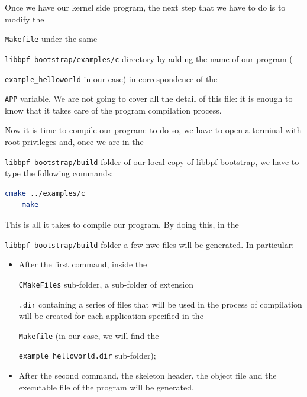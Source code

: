 Once we have our kernel side program, the next step that we have to do is to modify the \raggedright\colorbox{backcolour}{\lstinline[style=commandline, language=bash]|Makefile|} under the same \raggedright\colorbox{backcolour}{\lstinline[style=commandline, language=bash]|libbpf-bootstrap/examples/c|} directory by adding the name of our program (\raggedright\colorbox{backcolour}{\lstinline[style=commandline, language=bash]|example_helloworld|} in our case) in correspondence of the \raggedright\colorbox{backcolour}{\lstinline[style=commandline, language=bash]|APP|} variable.
We are not going to cover all the detail of this file: it is enough to know that it takes care of the program compilation process.

Now it is time to compile our program: to do so, we have to open a terminal with root privileges and, once we are in the \raggedright\colorbox{backcolour}{\lstinline[style=commandline, language=bash]|libbpf-bootstrap/build|} folder of our local copy of libbpf-bootstrap, we have to type the following commands:

\begin{lstlisting}[style=commandline, language=bash, caption={Programs compilation commands in libbpf-bootstrap.}]
	cmake ../examples/c
	make
\end{lstlisting}

This is all it takes to compile our program.
By doing this, in the \raggedright\colorbox{backcolour}{\lstinline[style=commandline, language=bash]|libbpf-bootstrap/build|} folder a few nwe files will be generated.
In particular:

\begin{itemize}
	\item 
		After the first command, inside the \raggedright\colorbox{backcolour}{\lstinline[style=commandline, language=bash]|CMakeFiles|} sub-folder, a sub-folder of extension \raggedright\colorbox{backcolour}{\lstinline[style=commandline, language=bash]|.dir|} containing a series of files that will be used in the process of compilation will be created for each application specified in the \raggedright\colorbox{backcolour}{\lstinline[style=commandline, language=bash]|Makefile|} (in our case, we will find the \raggedright\colorbox{backcolour}{\lstinline[style=commandline, language=bash]|example_helloworld.dir|} sub-folder);
	\item 
		After the second command, the skeleton header, the object file and the executable file of the program will be generated.
\end{itemize}

